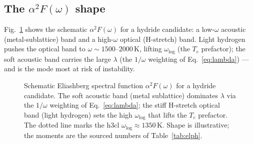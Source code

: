 \subsection{The $\alpha^2F(\omega)$ shape}
\label{app:elph-shape}

Fig.~\ref{fig:a2f} shows the schematic $\alpha^2F(\omega)$ for a hydride
candidate: a low-$\omega$ acoustic (metal-sublattice) band and a
high-$\omega$ optical (H-stretch) band. Light hydrogen pushes the optical
band to $\omega\!\sim\!1500$--$2000$\,K, lifting $\omega_{\log}$ (the $T_c$
prefactor); the soft acoustic band carries the large $\lambda$ (the
$1/\omega$ weighting of Eq.~\ref{eq:lambda}) --- and is the mode most at
risk of instability.

\begin{figure}[h]
\centering
{}
\caption{Schematic Eliashberg spectral function $\alpha^2F(\omega)$ for a
hydride candidate. The soft acoustic band (metal sublattice) dominates
$\lambda$ via the $1/\omega$ weighting of Eq.~\eqref{eq:lambda}; the stiff
H-stretch optical band (light hydrogen) sets the high $\omega_{\log}$ that
lifts the $T_c$ prefactor. The dotted line marks the h3cl
$\omega_{\log}\!\approx\!1350$\,K. Shape is illustrative; the moments are
the sourced numbers of Table~\ref{tab:elph}.}
\label{fig:a2f}
\end{figure}

